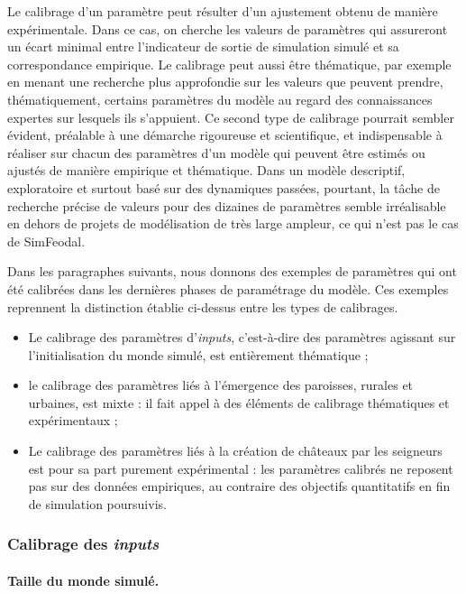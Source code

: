 Le calibrage d'un paramètre peut résulter d'un ajustement obtenu de manière expérimentale.
Dans ce cas, on cherche les valeurs de paramètres qui assureront un écart minimal entre l'indicateur de sortie de simulation simulé et sa correspondance empirique.
Le calibrage peut aussi être thématique, par exemple en menant une recherche plus approfondie sur les valeurs que peuvent prendre, thématiquement, certains paramètres du modèle au regard des connaissances expertes sur lesquels ils s'appuient.
Ce second type de calibrage pourrait sembler évident, préalable à une démarche rigoureuse et scientifique, et indispensable à réaliser sur chacun des paramètres d'un modèle qui peuvent être estimés ou ajustés de manière empirique et thématique.
Dans un modèle descriptif, exploratoire et surtout basé sur des dynamiques passées, pourtant, la tâche de recherche précise de valeurs pour des dizaines de paramètres semble irréalisable en dehors de projets de modélisation de très large ampleur, ce qui n'est pas le cas de SimFeodal.

Dans les paragraphes suivants, nous donnons des exemples de paramètres qui ont été calibrées dans les dernières phases de paramétrage du modèle.
Ces exemples reprennent la distinction établie ci-dessus entre les types de calibrages.
\begin{itemize}
	\item Le calibrage des paramètres d'\textit{inputs}, c'est-à-dire des paramètres agissant sur l'initialisation du monde simulé, est entièrement thématique ;
	\item le calibrage des paramètres liés à l'émergence des paroisses, rurales et urbaines, est mixte : il fait appel à des éléments de calibrage thématiques et expérimentaux ;
	\item Le calibrage des paramètres liés à la création de châteaux par les seigneurs est pour sa part purement expérimental : les paramètres calibrés ne reposent pas sur des données empiriques, au contraire des objectifs quantitatifs en fin de simulation poursuivis.
\end{itemize}


\subsubsection{Calibrage des \textit{inputs} \label{sssec:calibrage-inputs}}
\paragraph{Taille du monde simulé.}

